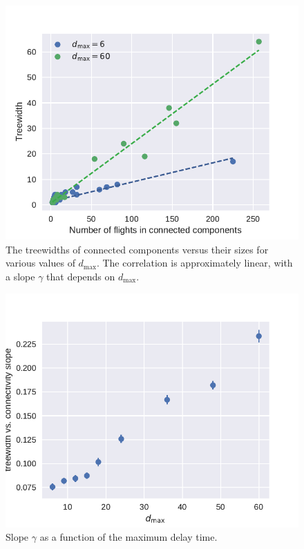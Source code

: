 \begin{figure}[htpb]
\includegraphics[width=\columnwidth]{pics/instances/treewidth_connectivity.pdf}
\caption[Correlation between connected component size and treewidth]{
The treewidths of connected components versus their sizes for various values of $d_{\max}$.
The correlation is approximately linear, with a slope $\gamma$ that depends on $d_{\max}$.
}
\label{fig:tw-vs-CC-size}
\end{figure}

\begin{figure}[htpb]
\includegraphics[width=\columnwidth]{pics/instances/treewidth_pl.pdf}
\caption[Treewidth-size correlation coefficient vs. $d_{\max}$]{Slope $\gamma$ as a function
  of the maximum delay time.}
\label{fig:treewidth-size-correlation}
\end{figure}

